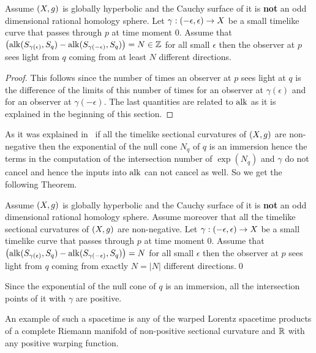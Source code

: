 \documentclass[12pt,reqno,a4paper]{amsart}
\begin{document}
\begin{thm}\label{theorem1}
Assume $(\ss, g)$ is globally hyperbolic and the Cauchy surface of it is {\bf not} an odd dimensional rational homology sphere.
Let $\gamma:(-\epsilon, \epsilon)\to \ss$ be a small timelike curve that passes through $p$ at time moment $0.$ Assume that 
$\bigl ( \alk(S_{\gamma(\epsilon)}, S_q) - \alk(S_{\gamma(-\epsilon)}, S_q)\bigr)
=N\in \Z$ for all small $\epsilon$ then the observer at $p$ sees light from $q$ coming from at least $N$ different directions.
\end{thm}

\begin{proof} This follows since the number of times an observer at $p$ sees light at $q$ is the difference of the limits of this number of times for an observer at $\gamma(\epsilon)$ and for an observer at $\gamma(-\epsilon)$. The last quantities are related to $\alk$ as it is explained in the beginning of this section.
\end{proof}


As it was explained in~\cite{ChernovRudyak} if all the timelike sectional curvatures of $(\ss, g)$ are non-negative then the exponential of the null cone $N_q$ of $q$ is an immersion hence the terms in the computation of the intersection number of $\exp(N_q)$ and $\gamma$ do not cancel and hence the inputs into $\alk$ can not cancel as well. So we get the following Theorem.

\begin{thm}\label{theorem2}
Assume $(\ss, g)$ is globally hyperbolic and the Cauchy surface of it is {\bf not} an odd dimensional rational homology sphere. Assume moreover that all the timelike sectional curvatures of $(\ss,g)$ are non-negative.
Let $\gamma:(-\epsilon, \epsilon)\to \ss$ be a small timelike curve that passes through $p$ at time moment $0.$ Assume that $\bigl ( \alk(S_{\gamma(\epsilon)}, S_q) - \alk(S_{\gamma(-\epsilon)}, S_q)\bigr)
=N$ for all small $\epsilon$ then the observer at $p$ sees light from $q$ coming from exactly $N=|N|$ different directions.\qed
\end{thm}

\begin{rem}
Since the exponential of the null cone of $q$ is an immersion, all the intersection points of it with $\gamma$ are positive.
\end{rem}

\begin{rem}
An example of such a spacetime is any of the warped Lorentz spacetime products of a complete Riemann manifold of non-positive sectional curvature and $\R$ with any positive warping function.
\end{rem}
\end{document}
